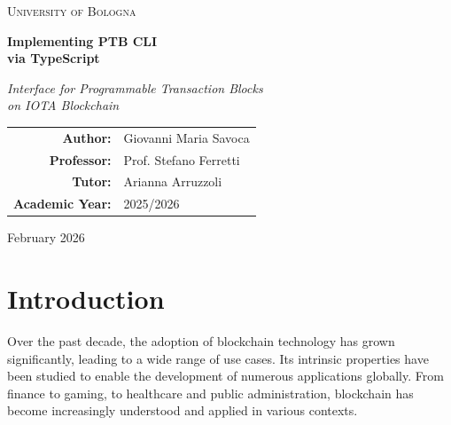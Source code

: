 \documentclass[12pt,a4paper]{article}
\begin{document}
\begin{titlepage}
    \centering
    \vspace*{2cm}
    
    {\scshape\LARGE University of Bologna \par}
    \vspace{1.5cm}
    
    {\Huge\bfseries Implementing PTB CLI \\ via TypeScript \par}
    \vspace{0.5cm}
    {\Large\itshape Interface for Programmable Transaction Blocks \\ on IOTA Blockchain \par}
    
    \vspace{3cm}
    
    {\Large
    \begin{tabular}{rl}
        \textbf{Author:} & Giovanni Maria Savoca \\[0.3cm]
        \textbf{Professor:} & Prof. Stefano Ferretti \\[0.3cm]
        \textbf{Tutor:} & Arianna Arruzzoli \\[0.3cm]
        \textbf{Academic Year:} & 2025/2026 \\
    \end{tabular}
    \par}
    
    \vfill
    
    {\large February 2026 \par}
    
\end{titlepage}

\tableofcontents
\newpage

\section{Introduction}

Over the past decade, the adoption of blockchain technology has grown significantly, leading to a wide range of use cases. Its intrinsic properties have been studied to enable the development of numerous applications globally. From finance to gaming, to healthcare and public administration, blockchain has become increasingly understood and applied in various contexts.
\end{document}
